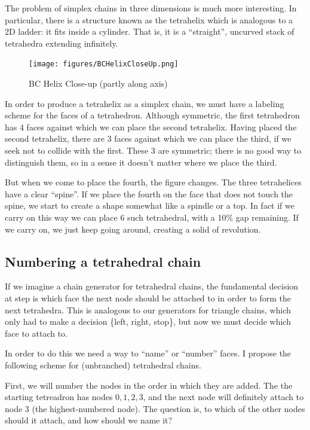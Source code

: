 \documentclass[11pt]{article}
\begin{document}
The problem of simplex chains in three dimensions is much more interesting. In particular, there is a structure known as the
tetrahelix which is analogous to a 2D ladder: it fits inside a cylinder. That is, it is a ``straight'', uncurved stack
of tetrahedra extending infinitely.


\begin{figure}
  \centering
     \texttt{[image: figures/BCHelixCloseUp.png]}
     \caption{BC Helix Close-up (partly along axis)}
  \label{fig:closeup}     
\end{figure}



In order to produce a tetrahelix as a simplex chain, we must have a labeling scheme for the faces of a tetrahedron.
Although symmetric, the first tetrahedron has 4 faces against which we can place the second tetrahelix.
Having placed the second tetrahelix, there are 3 faces against which we can place the third, if we
seek not to collide with the first. These 3 are symmetric; there is no good way to distinguish them,
so in a sense it doesn't matter where we place the third.

But when we come to place the fourth, the figure changes. The three tetrahelices have a clear ``spine''. If we
place the fourth on the face that does not touch the spine, we start to create a shape somewhat like a spindle or a top.
In fact if we carry on this way we can place 6 such tetrahedral, with a 10\% gap remaining. If we carry on, we just keep
going around, creating a solid of revolution.

\subsection{Numbering a tetrahedral chain}

If we imagine a chain generator for tetrahedral chains, the fundamental decision at step is which face the next node should be attached to in order
to form the next tetrahedra. This is analogous to our generators for triangle chains, which only had to make a decision \{left, right, stop\}, but
now we must decide which face to attach to.

In order to do this we need a way to ``name'' or ``number'' faces. I propose the following scheme for (unbranched) tetrahedral chains.

First, we will number the nodes in the order in which they are added. The the starting tetreadron has nodes ${0,1,2,3}$, and the next
node will definitely attach to node $3$ (the highest-numbered node). The question is, to which of the other nodes should it attach,
and how should we name it?
\end{document}
